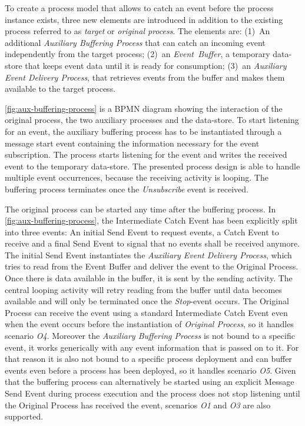To create a process model that allows to catch an event before the process instance exists, three new elements are introduced in addition to the existing process referred to as \textit{target} or \textit{original process}. The elements are: (1)~An additional \textit{Auxiliary Buffering Process} that can catch an incoming event independently from the target process; (2)~an \textit{Event~Buffer}, a temporary data-store that keeps event data until it is ready for consumption; (3)~an \textit{Auxiliary Event Delivery Process}, that retrieves events from the buffer and makes them available to the target process.


\autoref{fig:aux-buffering-process} is a BPMN diagram showing the interaction of the original process, the two auxiliary processes and the data-store. To start listening for an event, the auxiliary buffering process has to be instantiated through a message start event containing the information necessary for the event subscription. The process starts listening for the event and writes the received event to the temporary data-store. 
The presented process design is able to handle multiple event occurrences, because the receiving activity is looping. The buffering process terminates once the \textit{Unsubscribe} event is received.


The original process can be started any time after the buffering process. In \autoref{fig:aux-buffering-process}, the Intermediate Catch Event has been explicitly split into three events: An initial Send Event to request events, a Catch Event to receive and a final Send Event to signal that no events shall be received anymore.
The initial Send Event instantiates the \textit{Auxiliary Event Delivery Process}, which tries to read from the Event Buffer and deliver the event to the Original Process. Once there is data available in the buffer, it is sent by the sending activity. The central looping activity will retry reading from the buffer until data becomes available and will only be terminated once the \textit{Stop}-event occurs. 
The Original Process can receive the event using a standard Intermediate Catch Event even when the event occurs before the instantiation of \textit{Original Process}, so it handles scenario \textit{O4}. 
Moreover the \textit{Auxiliary Buffering Process} is not bound to a specific event, it works generically with any event information that is passed on to it. For that reason it is also not bound to a specific process deployment and can buffer events even before a process has been deployed, so it handles scenario \textit{O5}.
Given that the buffering process can alternatively be started using an explicit Message Send Event during process execution and the process does not stop listening until the Original Process has received the event, scenarios \textit{O1} and \textit{O3} are also supported.


